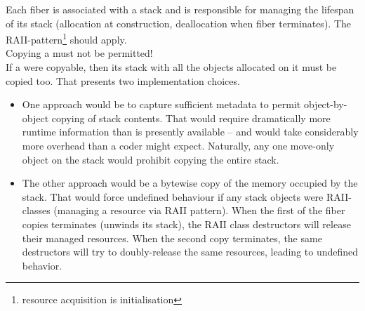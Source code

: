 \label{stackmgmt}

Each fiber is associated with a stack and is responsible for managing the lifespan
of its stack (allocation at construction, deallocation when fiber terminates). The
RAII-pattern\footnote{resource acquisition is initialisation} should apply.\\

Copying a \fiber must not be permitted!\\
If a \fiber were copyable, then its stack with all the objects allocated on it
must be copied too. That presents two implementation choices.
\begin{itemize}
    \item One approach would be to capture sufficient metadata to permit
          object-by-object copying of stack contents. That would require
          dramatically more runtime information than is presently available --
          and would take considerably more overhead than a coder might expect.
          Naturally, any one move-only object on the stack would prohibit
          copying the entire stack.
    \item The other approach would be a bytewise copy of the memory occupied
          by the stack. That would force undefined behaviour if any stack
          objects were RAII-classes (managing a resource via RAII pattern). When the first
          of the fiber copies terminates (unwinds its stack), the RAII class destructors
          will release their managed resources. When the second copy terminates, the same
          destructors will try to doubly-release the same resources, leading to undefined
          behavior.
\end{itemize}


